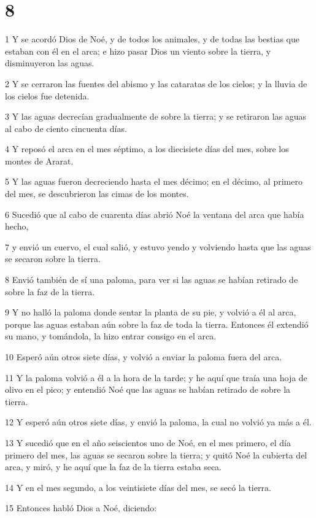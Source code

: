 \chapter{8}

1 Y se acordó Dios de Noé, y de todos los animales, y de todas las bestias que estaban con él en el arca; e hizo pasar Dios un viento sobre la tierra, y disminuyeron las aguas.

2 Y se cerraron las fuentes del abismo y las cataratas de los cielos; y la lluvia de los cielos fue detenida.

3 Y las aguas decrecían gradualmente de sobre la tierra; y se retiraron las aguas al cabo de ciento cincuenta días.

4 Y reposó el arca en el mes séptimo, a los diecisiete días del mes, sobre los montes de Ararat.

5 Y las aguas fueron decreciendo hasta el mes décimo; en el décimo, al primero del mes, se descubrieron las cimas de los montes.

6 Sucedió que al cabo de cuarenta días abrió Noé la ventana del arca que había hecho,

7 y envió un cuervo, el cual salió, y estuvo yendo y volviendo hasta que las aguas se secaron sobre la tierra.

8 Envió también de sí una paloma, para ver si las aguas se habían retirado de sobre la faz de la tierra.

9 Y no halló la paloma donde sentar la planta de su pie, y volvió a él al arca, porque las aguas estaban aún sobre la faz de toda la tierra. Entonces él extendió su mano, y tomándola, la hizo entrar consigo en el arca.

10 Esperó aún otros siete días, y volvió a enviar la paloma fuera del arca.

11 Y la paloma volvió a él a la hora de la tarde; y he aquí que traía una hoja de olivo en el pico; y entendió Noé que las aguas se habían retirado de sobre la tierra.

12 Y esperó aún otros siete días, y envió la paloma, la cual no volvió ya más a él.

13 Y sucedió que en el año seiscientos uno de Noé, en el mes primero, el día primero del mes, las aguas se secaron sobre la tierra; y quitó Noé la cubierta del arca, y miró, y he aquí que la faz de la tierra estaba seca.

14 Y en el mes segundo, a los veintisiete días del mes, se secó la tierra.

15 Entonces habló Dios a Noé, diciendo:

